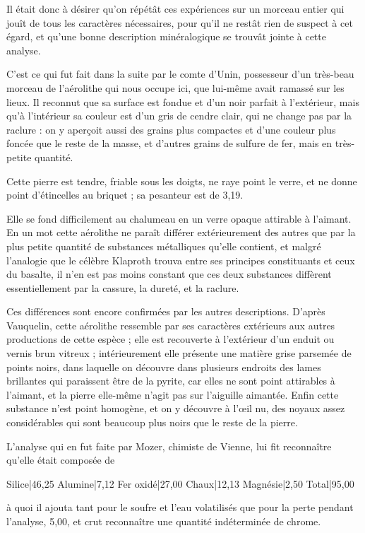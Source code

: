 \documentclass[a4paper, 12pt, oneside, french]{article}
\begin{document}
Il était donc à désirer qu'on répétât ces expériences sur un morceau entier qui jouît de tous les caractères nécessaires, pour qu'il ne restât rien de suspect à cet égard, et qu'une bonne description minéralogique se trouvât jointe à cette analyse.

C'est ce qui fut fait dans la suite par le comte d'Unin, possesseur d'un très-beau morceau de l'aérolithe qui nous occupe ici, que lui-même avait ramassé sur les lieux. Il reconnut que sa surface est fondue et d'un noir parfait à l'extérieur, mais qu'à l'intérieur sa couleur est d'un gris de cendre clair, qui ne change pas par la raclure : on y aperçoit aussi des grains plus compactes et d'une couleur plus foncée que le reste de la masse, et d'autres grains de sulfure de fer, mais en très-petite quantité.

Cette pierre est tendre, friable sous les doigts, ne raye point le verre, et ne donne point d'étincelles au briquet ; sa pesanteur est de 3,19.

Elle se fond difficilement au chalumeau en un verre opaque attirable à l'aimant. En un mot cette aérolithe ne paraît différer extérieurement des autres que par la plus petite quantité de substances métalliques qu'elle contient, et malgré l'analogie que le célèbre Klaproth trouva entre ses principes constituants et ceux du basalte, il n'en est pas moins constant que ces deux substances diffèrent essentiellement par la cassure, la dureté, et la raclure.

Ces différences sont encore confirmées par les autres descriptions. D'après Vauquelin, cette aérolithe ressemble par ses caractères extérieurs aux autres productions de cette espèce ; elle est recouverte à l'extérieur d'un enduit ou vernis brun vitreux ; intérieurement elle présente une matière grise parsemée de points noirs, dans laquelle on découvre dans plusieurs endroits des lames brillantes qui paraissent être de la pyrite, car elles ne sont point attirables à l'aimant, et la pierre elle-même n'agit pas sur l'aiguille aimantée. Enfin cette substance n'est point homogène, et on y découvre à l'œil nu, des noyaux assez considérables qui sont beaucoup plus noirs que le reste de la pierre.

L'analyse qui en fut faite par Mozer, chimiste de Vienne, lui fit reconnaître qu'elle était composée de

Silice|46,25  
Alumine|7,12  
Fer oxidé|27,00  
Chaux|12,13  
Magnésie|2,50  
Total|95,00  

à quoi il ajouta tant pour le soufre et l'eau volatilisés que pour la perte pendant l'analyse, 5,00, et crut reconnaître une quantité indéterminée de chrome.
\end{document}
